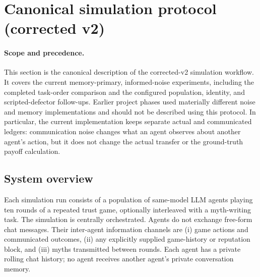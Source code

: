 %     

\section{Canonical simulation protocol (corrected v2)}
\label{sec:canonical-simulation-protocol}

\paragraph{Scope and precedence.}
This section is the canonical description of the corrected-v2 simulation
workflow. It covers the current memory-primary, informed-noise experiments,
including the completed task-order comparison and the configured population,
identity, and scripted-defector follow-ups. Earlier project phases used
materially different noise and memory implementations and should not be
described using this protocol. In particular, the current implementation keeps
separate actual and communicated ledgers: communication noise changes what an
agent observes about another agent's action, but it does not change the actual
transfer or the ground-truth payoff calculation.

\subsection{System overview}
\label{sec:protocol-overview}

Each simulation run consists of a population of same-model LLM agents playing
ten rounds of a repeated trust game, optionally interleaved with a myth-writing
task. The simulation is centrally orchestrated. Agents do not exchange
free-form chat messages. Their inter-agent information channels are (i) game
actions and communicated outcomes, (ii) any explicitly supplied game-history
or reputation block, and (iii) myths transmitted between rounds. Each agent
has a private rolling chat history; no agent receives another agent's private
conversation memory.

